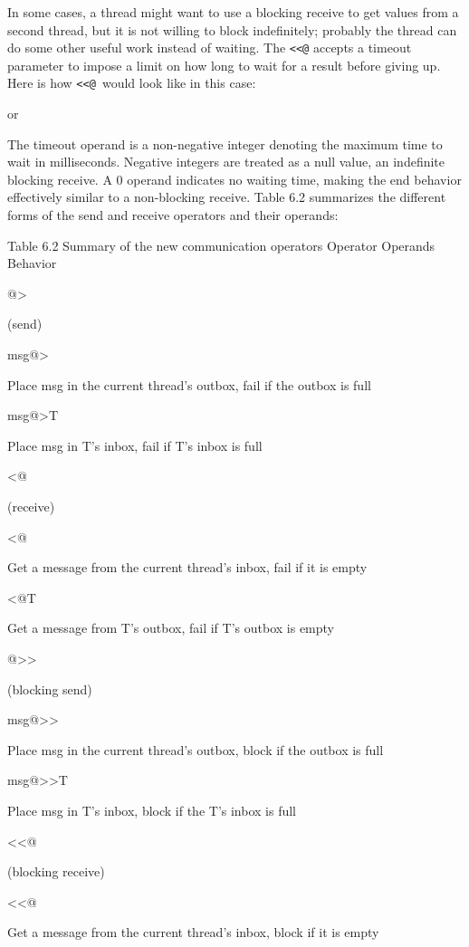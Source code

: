 In some cases, a thread might want to use a blocking receive to get values from
a second thread, but it is not willing to block indefinitely; probably the thread
can do some other useful work instead of waiting. The \texttt{<{}<@}  accepts a timeout parameter
to impose a limit on how long to wait for a result before giving up. Here is how
\texttt{<{}<@ }would look like in this case:

\noindent or 
  
The timeout operand is a non-negative integer denoting the maximum time to
wait in milliseconds. Negative integers are treated as a null value, an
indefinite blocking receive. A 0 operand indicates no waiting time, making
the end behavior effectively similar to a non-blocking receive. Table 6.2
summarizes the different forms of the send and receive operators and their
operands:
  
Table 6.2 Summary of the new communication operators
Operator
Operands
Behavior

@> 

(send)

msg@>

Place msg in the current thread's outbox, fail if the outbox is full

msg@>T

Place msg in T's inbox, fail if T's inbox is full

<@

(receive)

<@

Get a message from the current thread's inbox, fail if it is empty

<@T

Get a message from T's outbox, fail if T's outbox is empty

@>>

(blocking send)

msg@>>

Place msg in the current thread's outbox, block if the outbox is full

msg@>>T

Place msg in T's inbox, block if the T's inbox is full

<<@

(blocking receive)

<<@

Get a message from the current thread's inbox, block if it is empty

